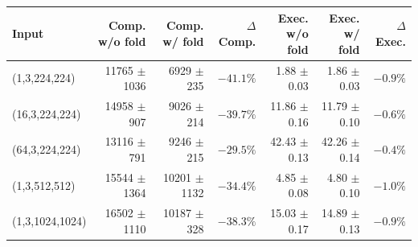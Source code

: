 \begin{tabular}{lrrrrrr}
\toprule
\textbf{Input} & \textbf{Comp. w/o fold} & \textbf{Comp. w/ fold} & \(\Delta\)\textbf{ Comp.} & \textbf{Exec. w/o fold} & \textbf{Exec. w/ fold} & \(\Delta\)\textbf{ Exec.} \\
\midrule
(1,3,224,224) & 11765 $\pm$ 1036 & 6929 $\pm$ 235 & \(-41.1\%\) & 1.88 $\pm$ 0.03 & 1.86 $\pm$ 0.03 & \(-0.9\%\) \\
(16,3,224,224) & 14958 $\pm$ 907 & 9026 $\pm$ 214 & \(-39.7\%\) & 11.86 $\pm$ 0.16 & 11.79 $\pm$ 0.10 & \(-0.6\%\) \\
(64,3,224,224) & 13116 $\pm$ 791 & 9246 $\pm$ 215 & \(-29.5\%\) & 42.43 $\pm$ 0.13 & 42.26 $\pm$ 0.14 & \(-0.4\%\) \\
(1,3,512,512) & 15544 $\pm$ 1364 & 10201 $\pm$ 1132 & \(-34.4\%\) & 4.85 $\pm$ 0.08 & 4.80 $\pm$ 0.10 & \(-1.0\%\) \\
(1,3,1024,1024) & 16502 $\pm$ 1110 & 10187 $\pm$ 328 & \(-38.3\%\) & 15.03 $\pm$ 0.17 & 14.89 $\pm$ 0.13 & \(-0.9\%\) \\
\bottomrule
\end{tabular}

